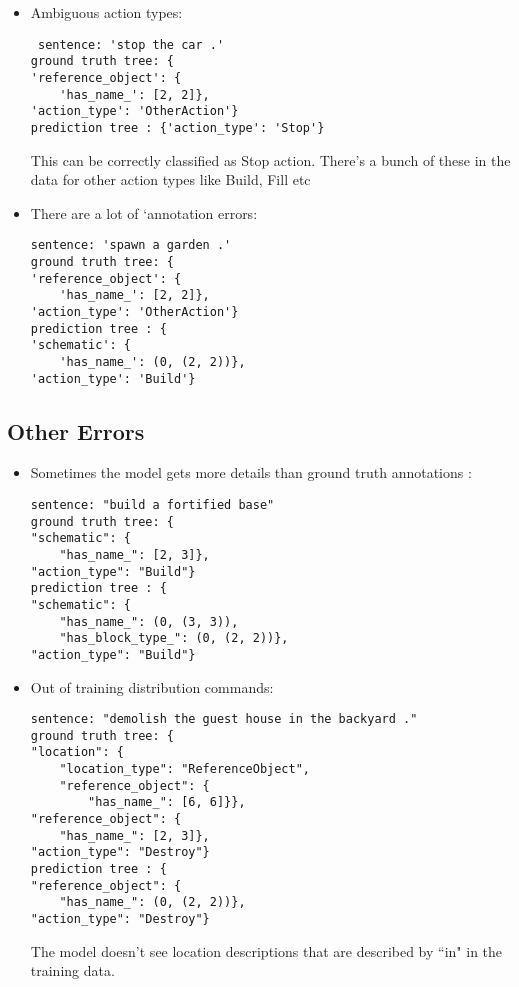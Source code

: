  \begin{itemize}
 \item Ambiguous action types:
 \begin{verbatim}
 sentence: 'stop the car .'
ground truth tree: {
'reference_object': {
    'has_name_': [2, 2]}, 
'action_type': 'OtherAction'}
prediction tree : {'action_type': 'Stop'}
\end{verbatim}
This can be correctly classified as Stop action. There's a bunch of these in the data for other action types like Build, Fill etc
\item There are a lot of `annotation errors:
\begin{verbatim}
sentence: 'spawn a garden .'
ground truth tree: {
'reference_object': {
    'has_name_': [2, 2]}, 
'action_type': 'OtherAction'}
prediction tree : {
'schematic': {
    'has_name_': (0, (2, 2))}, 
'action_type': 'Build'}
\end{verbatim}
 \end{itemize}

 \subsection{Other Errors}
 \begin{itemize}
 \item Sometimes the model gets more details than ground truth annotations :
\begin{verbatim}
sentence: "build a fortified base"
ground truth tree: {
"schematic": {
    "has_name_": [2, 3]}, 
"action_type": "Build"}
prediction tree : {
"schematic": {
    "has_name_": (0, (3, 3)), 
    "has_block_type_": (0, (2, 2))}, 
"action_type": "Build"}
\end{verbatim}
\item Out of training distribution commands:

\begin{verbatim}
sentence: "demolish the guest house in the backyard ."
ground truth tree: {
"location": {
    "location_type": "ReferenceObject", 
    "reference_object": {
        "has_name_": [6, 6]}}, 
"reference_object": {
    "has_name_": [2, 3]}, 
"action_type": "Destroy"}
prediction tree : {
"reference_object": {
    "has_name_": (0, (2, 2))},
"action_type": "Destroy"}
\end{verbatim}
The model doesn't see location descriptions that are described by ``in" in the training data.
 \end{itemize}

